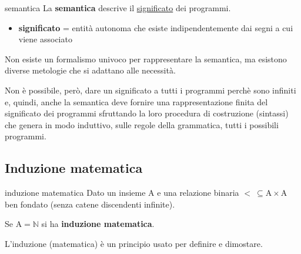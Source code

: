 \begin{mydef}{semantica}
    La \textbf{semantica} descrive il \underline{significato} dei programmi.

    \smallskip
    \begin{itemize}[label=$\Rightarrow$]
        \item \textbf{significato} = entità autonoma che esiste indipendentemente dai segni a cui viene associato
    \end{itemize}
\end{mydef}

Non esiste un formalismo univoco per rappresentare la semantica, ma esistono diverse metologie che si adattano alle necessità.

\medskip
Non è possibile, però, dare un significato a tutti i programmi perchè sono infiniti e, quindi, anche la semantica deve fornire una rappresentazione finita del significato dei programmi sfruttando la loro procedura di costruzione (sintassi) che genera in modo induttivo, sulle regole della grammatica, tutti i possibili programmi.

\subsection{Induzione matematica}
\begin{mydef}{induzione matematica}
    Dato un insieme $\mathrm{A}$ e una relazione binaria $\mathrm{< \ \subseteq A \times A}$ ben fondato (senza catene discendenti infinite).

    Se $\mathrm{A = \mathbb{N}}$ si ha \textbf{induzione matematica}.
\end{mydef}

L'induzione (matematica) è un principio usato per definire e dimostare.


